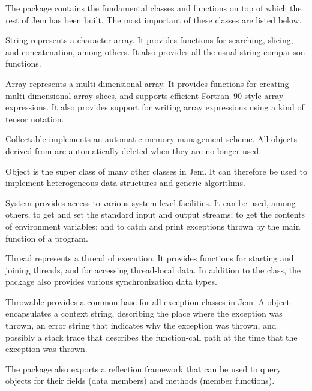 \documentclass[a4paper,10pt]{article}
\begin{document}
The package  contains the fundamental classes and functions on
top of which the rest of Jem has been built. The most important of these
classes are listed below.
\begin{Description}[\Code]

\item[String] represents a character array. It provides functions for
  searching, slicing, and concatenation, among others. It also provides
  all the usual string comparison functions.

\item[Array] represents a multi-dimensional array. It provides functions
  for creating multi-dimensional array slices, and supports efficient
  Fortran~90-style array expressions. It also provides support for
  writing array expressions using a kind of tensor notation.

\item[Collectable] implements an automatic memory management scheme. All
  objects derived from  are automatically deleted when
  they are no longer used.

\item[Object] is the super class of many other classes in Jem. It can
  therefore be used to implement heterogeneous data structures and
  generic algorithms.

\item[System] provides access to various system-level facilities. It can
  be used, among others, to get and set the standard input and output
  streams; to get the contents of environment variables; and to catch and
  print exceptions thrown by the main function of a program.

\item[Thread] represents a thread of execution. It provides functions for
  starting and joining threads, and for accessing thread-local data. In
  addition to the  class, the  package also
  provides various synchronization data types.

\item[Throwable] provides a common base for all exception classes in Jem.
  A  object encapsulates a context string, describing the
  place where the exception was thrown, an error string that indicates
  why the exception was thrown, and possibly a stack trace that describes
  the function-call path at the time that the exception was thrown.

\end{Description}
The  package also exports a reflection framework that can
be used to query objects for their fields (data members) and methods
(member functions).
\end{document}

